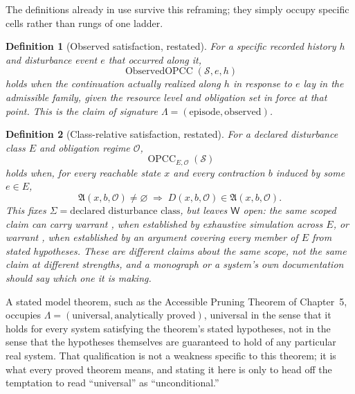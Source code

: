 \documentclass[11pt]{report}
\newtheorem{definition}{Definition}[chapter]
\begin{document}
The definitions already in use survive this reframing; they simply occupy specific cells rather than rungs of one ladder.

\begin{definition}[Observed satisfaction, restated]
For a specific recorded history $h$ and disturbance event $e$ that occurred along it,
\[
\operatorname{ObservedOPCC}(\mathcal S, e, h)
\]
holds when the continuation actually realized along $h$ in response to $e$ lay in the admissible family, given the resource level and obligation set in force at that point. This is the claim of signature $\Lambda = (\text{episode}, \text{observed})$.
\end{definition}

\begin{definition}[Class-relative satisfaction, restated]
For a declared disturbance class $E$ and obligation regime $\mathcal O$,
\[
\operatorname{OPCC}_{E, \mathcal O}(\mathcal S)
\]
holds when, for every reachable state $x$ and every contraction $b$ induced by some $e \in E$,
\[
\mathfrak A(x, b, \mathcal O) \ne \varnothing \;\Longrightarrow\; D(x, b, \mathcal O) \in \mathfrak A(x, b, \mathcal O).
\]
This fixes $\Sigma = \text{declared disturbance class}$, but leaves $\mathsf W$ open: the same scoped claim can carry warrant , when established by exhaustive simulation across $E$, or warrant , when established by an argument covering every member of $E$ from stated hypotheses. These are different claims about the same scope, not the same claim at different strengths, and a monograph or a system's own documentation should say which one it is making.
\end{definition}

A stated model theorem, such as the Accessible Pruning Theorem of Chapter~5, occupies $\Lambda = (\text{universal}, \text{analytically proved})$, universal in the sense that it holds for every system satisfying the theorem's stated hypotheses, not in the sense that the hypotheses themselves are guaranteed to hold of any particular real system. That qualification is not a weakness specific to this theorem; it is what every proved theorem means, and stating it here is only to head off the temptation to read ``universal'' as ``unconditional.''
\end{document}
